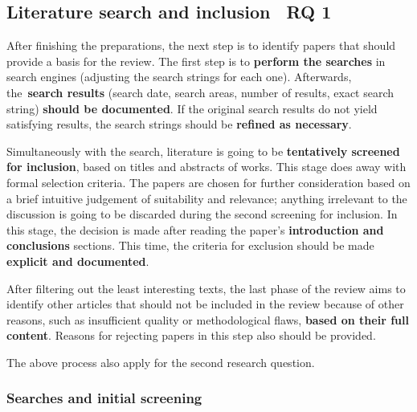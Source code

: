 \subsection{Literature search and inclusion \textendash\ RQ 1}\label{subsec:literature-search-inclusion-rq-1}

After finishing the preparations, the next step is to identify papers that should provide a basis for the review.
The first step is to \textbf{perform the searches} in search engines (adjusting the search strings for each one).
Afterwards, the\ \textbf{search results} (search date, search areas, number of results, exact search string) \textbf{should be documented}.
If the original search results do not yield satisfying results, the search strings should be \textbf{refined as necessary}.

Simultaneously with the search, literature is going to be \textbf{tentatively screened for inclusion}, based on titles and abstracts of works.
This stage does away with formal selection criteria.
The papers are chosen for further consideration based on a brief intuitive judgement of suitability and relevance;
anything irrelevant to the discussion is going to be discarded during the second screening for inclusion.
In this stage, the decision is made after reading the paper's \textbf{introduction and conclusions} sections.
This time, the criteria for exclusion should be made \textbf{explicit and documented}.

After filtering out the least interesting texts, the last phase of the review aims to identify other articles
that should not be included in the review because of other reasons, such as insufficient quality or methodological flaws,
\textbf{based on their full content}.
Reasons for rejecting papers in this step also should be provided.


The above process also apply for the second research question.


\subsubsection{Searches and initial screening}\label{subsubsec:searches-and-initial-screening}

